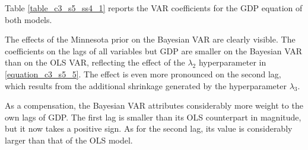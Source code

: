 \newpage

Table \ref{table_c3_s5_ss4_1} reports the VAR coefficients for the GDP equation of both models.

\begin{table}[H] \centering
{}
\captionsetup{justification=centering}
\caption{\textbf{VAR coefficients of GDP equation}}
\label{table_c3_s5_ss4_1}
\end{table}

The effects of the Minnesota prior on the Bayesian VAR are clearly visible. The coefficients on the lags of all variables but GDP are smaller on the Bayesian VAR than on the OLS VAR, reflecting the effect of the $\lambda_2$ hyperparameter in \ref{equation_c3_s5_5}. The effect is even more pronounced on the second lag, which results from the additional shrinkage generated by the hyperparameter $\lambda_3$.

As a compensation, the Bayesian VAR attributes considerably more weight to the own lags of GDP. The first lag is smaller than its OLS counterpart in magnitude, but it now takes a positive sign. As for the second lag, its value is considerably larger than that of the OLS model.

